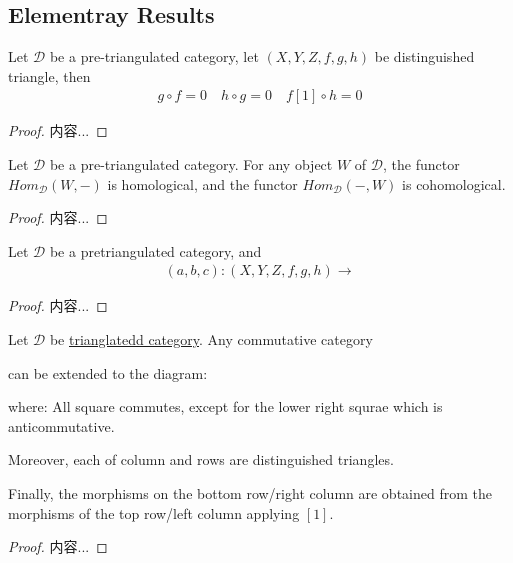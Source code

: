 \documentclass[Total.tex]{subfiles}
\begin{document}
			\subsection{Elementray Results}
				\begin{lemma}
					Let $\mathcal{D}$ be a pre-triangulated category, let $(X,Y,Z,f,g,h)$ be distinguished triangle, then
					\begin{gather*}
						g\circ f=0\quad h\circ g=0\quad f[1]\circ h=0
					\end{gather*}
				\end{lemma}
				\begin{proof}
					内容...
				\end{proof}
				
				\begin{lemma}
					Let $\mathcal{D}$ be a pre-triangulated category. For any object $W$ of $\mathcal{D}$, the functor $Hom_\mathcal{D}(W,-)$ is homological, and the functor $Hom_{\mathcal{D}}(-,W)$ is cohomological.
				\end{lemma}
				\begin{proof}
					内容...
				\end{proof}
				
				\begin{lemma}
					Let $\mathcal{D}$ be a pretriangulated category, and
					\begin{gather*}
						(a,b,c):(X,Y,Z,f,g,h)\rightarrow 
					\end{gather*}
				\end{lemma}
				\begin{proof}
					内容...
				\end{proof}
				
				\begin{proposition}
					Let $\mathcal{D}$ be \underline{trianglatedd category}. Any commutative category
					\begin{center}
					\end{center}
					can be extended to the diagram:
					\begin{center}
					\end{center}
					where: All square commutes, except for the lower right squrae which is anticommutative.
					
					Moreover, each of column and rows are distinguished triangles.
					
					Finally, the morphisms on the bottom row/right column are obtained from the morphisms of the top row/left column applying $[1]$.
				\end{proposition}
				\begin{proof}
					内容...
				\end{proof}
\end{document}
